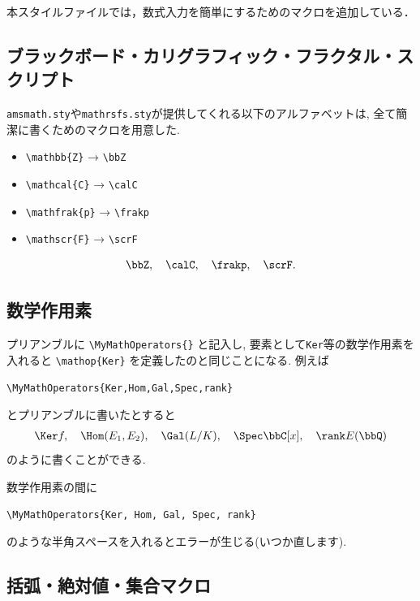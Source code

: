 \documentclass[
	paper=a4,
	fontsize=10pt, %
	jafontsize=12Q,
	jafontscale=0.92,
]{jlreq}
\begin{document}
本スタイルファイルでは，数式入力を簡単にするためのマクロを追加している．

\subsection{ブラックボード・カリグラフィック・フラクタル・スクリプト}

\texttt{amsmath.sty}や\texttt{mathrsfs.sty}が提供してくれる以下のアルファベットは, 全て簡潔に書くためのマクロを用意した.
\begin{itemize}
    \item \verb|\mathbb{Z}| → \verb|\bbZ|
    \item \verb|\mathcal{C}| → \verb|\calC|
    \item \verb|\mathfrak{p}| → \verb|\frakp|
    \item \verb|\mathscr{F}| → \verb|\scrF|
\end{itemize}

\begin{ex}{}{}
	\begin{align}
		\bbZ, \quad \calC, \quad \frakp, \quad \scrF.
	\end{align}
\end{ex}

\subsection{数学作用素}

プリアンブルに \verb|\MyMathOperators{}| と記入し, 要素として\texttt{Ker}等の数学作用素を入れると \verb|\mathop{Ker}| を定義したのと同じことになる.
例えば
\begin{center}
	\verb|\MyMathOperators{Ker,Hom,Gal,Spec,rank}|
\end{center}
とプリアンブルに書いたとすると
\begin{align}
	\Ker f, \quad \Hom(E_1, E_2), \quad \Gal(L/K), \quad \Spec \bbC[x], \quad \rank E(\bbQ)
\end{align}
のように書くことができる.

\begin{rem}{}{}
	数学作用素の間に
	\begin{center}
		\verb|\MyMathOperators{Ker, Hom, Gal, Spec, rank}|
	\end{center}
	のような半角スペースを入れるとエラーが生じる(いつか直します).
\end{rem}

\subsection{括弧・絶対値・集合マクロ}
\end{document}
